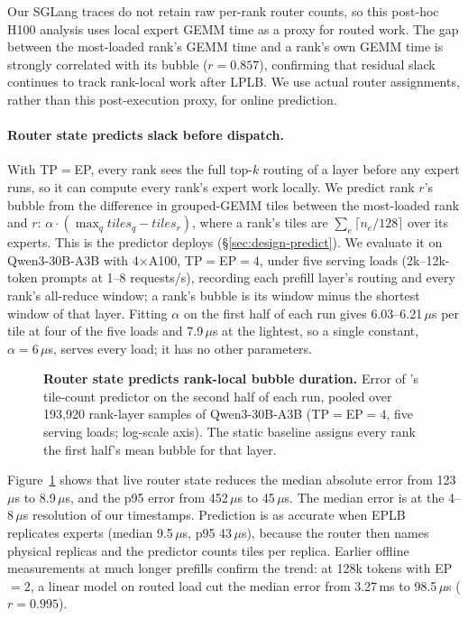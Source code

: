 Our SGLang traces do not retain raw per-rank router counts, so this
post-hoc H100 analysis uses local expert \ac{GEMM} time as a proxy for
routed work. The gap between the most-loaded rank's \ac{GEMM} time and
a rank's own \ac{GEMM} time is strongly correlated with its bubble
($r=0.857$), confirming that residual slack continues to track
rank-local work after LPLB. We use actual router assignments, rather
than this post-execution proxy, for online prediction.

\paragraph{Router state predicts slack before dispatch.}
With \ac{TP}$=$\ac{EP}, every rank sees the full top-$k$ routing of a
layer before any expert runs, so it can compute every rank's expert work
locally. We predict rank $r$'s bubble from the difference in grouped-\ac{GEMM}
tiles between the most-loaded rank and $r$:
$\alpha\cdot(\max_q \mathit{tiles}_q - \mathit{tiles}_r)$, where a rank's
tiles are $\sum_e \lceil n_e/128 \rceil$ over its experts. This is the
predictor \sys{} deploys (\S\ref{sec:design-predict}). We evaluate it on
Qwen3-30B-A3B with 4$\times$A100, \ac{TP}$=$\ac{EP}$=4$, under five serving
loads (2k--12k-token prompts at 1--8 requests/s), recording each prefill
layer's routing and every rank's all-reduce window; a rank's bubble is its
window minus the shortest window of that layer. Fitting $\alpha$ on the
first half of each run gives 6.03--6.21\,$\mu$s per tile at four of the
five loads and 7.9\,$\mu$s at the lightest, so a single constant,
$\alpha=6\,\mu$s, serves every load; it has no other parameters.

\begin{figure}[t]
  \centering
  \caption{
    \textbf{Router state predicts rank-local bubble duration.}
    Error of \sys{}'s tile-count predictor on the second half of each run,
    pooled over 193{,}920 rank-layer samples of Qwen3-30B-A3B
    (\ac{TP}$=$\ac{EP}$=4$, five serving loads; log-scale axis). The static
    baseline assigns every rank the first half's mean bubble for that layer.
  }
  \label{fig:bubble-predict-error}
\end{figure}

Figure~\ref{fig:bubble-predict-error} shows that live router state reduces
the median absolute error from 123\,$\mu$s to 8.9\,$\mu$s, and the p95
error from 452\,$\mu$s to 45\,$\mu$s. The median error is at the
4--8\,$\mu$s resolution of our timestamps. Prediction is as accurate when
EPLB replicates experts (median 9.5\,$\mu$s, p95 43\,$\mu$s), because the
router then names physical replicas and the predictor counts tiles per
replica. Earlier offline measurements at much longer prefills confirm the
trend: at 128k tokens with \ac{EP}$=2$, a linear model on routed load cut
the median error from 3.27\,ms to 98.5\,$\mu$s ($r=0.995$).

